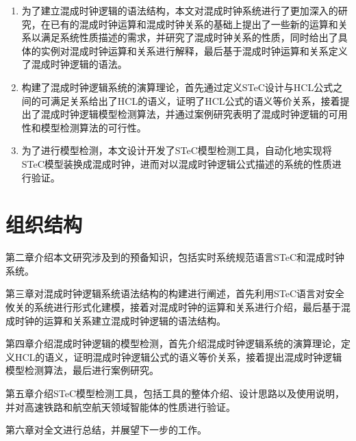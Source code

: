 \begin{enumerate}
	\item 为了建立混成时钟逻辑的语法结构，本文对混成时钟系统进行了更加深入的研究，在已有的混成时钟运算和混成时钟关系的基础上提出了一些新的运算和关系以满足系统性质描述的需求，并研究了混成时钟关系的性质，同时给出了具体的实例对混成时钟运算和关系进行解释，最后基于混成时钟运算和关系定义了混成时钟逻辑的语法。
	
	\item 构建了混成时钟逻辑系统的演算理论，首先通过定义STeC设计与HCL公式之间的可满足关系给出了HCL的语义，证明了HCL公式的语义等价关系，接着提出了混成时钟逻辑模型检测算法，并通过案例研究表明了混成时钟逻辑的可用性和模型检测算法的可行性。
	
	\item 为了进行模型检测，本文设计开发了STeC模型检测工具，自动化地实现将STeC模型装换成混成时钟，进而对以混成时钟逻辑公式描述的系统的性质进行验证。
\end{enumerate}

\section{组织结构}
第二章介绍本文研究涉及到的预备知识，包括实时系统规范语言STeC和混成时钟系统。

第三章对混成时钟逻辑系统语法结构的构建进行阐述，首先利用STeC语言对安全攸关的系统进行形式化建模，接着对混成时钟的运算和关系进行介绍，最后基于混成时钟的运算和关系建立混成时钟逻辑的语法结构。

第四章介绍混成时钟逻辑的模型检测，首先介绍混成时钟逻辑系统的演算理论，定义HCL的语义，证明混成时钟逻辑公式的语义等价关系，接着提出混成时钟逻辑模型检测算法，最后进行案例研究。

第五章介绍STeC模型检测工具，包括工具的整体介绍、设计思路以及使用说明，并对高速铁路和航空航天领域智能体的性质进行验证。

第六章对全文进行总结，并展望下一步的工作。




